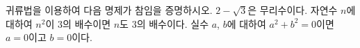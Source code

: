 귀류법을 이용하여 다음 명제가 참임을 증명하시오.
 $2-\sqrt{3}$은 무리수이다.
 자연수 $n$에 대하여 $n^2$이 $3$의 배수이면 $n$도 $3$의 배수이다.
 실수 $a$, $b$에 대하여 $a^2+b^2=0$이면 $a=0$이고 \mbox{$b=0$이다.}
